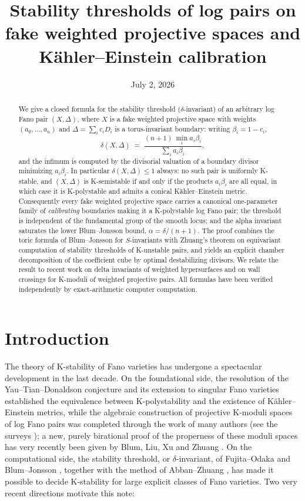 \documentclass[11pt]{amsart}
\title[Stability thresholds of fake weighted projective spaces]{Stability
thresholds of log pairs on fake weighted projective spaces and
K\"ahler--Einstein calibration}
\date{July 2, 2026}
\theoremstyle{definition}
\theoremstyle{remark}
\begin{document}
\begin{abstract}
We give a closed formula for the stability threshold (\(\delta\)-invariant)
of an arbitrary log Fano pair \((X,\Delta)\), where \(X\) is a fake weighted
projective space with weights \((a_0,\dots,a_n)\) and
\(\Delta=\sum_i c_i D_i\) is a torus-invariant boundary: writing
\(\beta_i = 1-c_i\),
\[
\delta(X,\Delta) \;=\; \frac{(n+1)\,\min_i a_i\beta_i}{\sum_i a_i\beta_i},
\]
and the infimum is computed by the divisorial valuation of a boundary
divisor minimizing \(a_i\beta_i\). In particular \(\delta(X,\Delta)\le 1\)
always: no such pair is uniformly K-stable, and \((X,\Delta)\) is
K-semistable if and only if the products \(a_i\beta_i\) are all equal, in
which case it is K-polystable and admits a conical K\"ahler--Einstein
metric. Consequently every fake weighted projective space carries a
canonical one-parameter family of \emph{calibrating} boundaries making it a
K-polystable log Fano pair; the threshold is independent of the fundamental
group of the smooth locus; and the alpha invariant saturates the lower
Blum--Jonsson bound, \(\alpha = \delta/(n+1)\). The proof combines the
toric formula of Blum--Jonsson for \(S\)-invariants with Zhuang's theorem
on equivariant computation of stability thresholds of K-unstable pairs,
and yields an explicit chamber decomposition of the coefficient cube by
optimal destabilizing divisors. We relate the result to recent work on
delta invariants of weighted hypersurfaces and on wall crossings for
K-moduli of weighted projective pairs. All formulas have been verified
independently by exact-arithmetic computer computation.
\end{abstract}

\maketitle

\section{Introduction}\label{sec:intro}

The theory of K-stability of Fano varieties has undergone a spectacular
development in the last decade. On the foundational side, the resolution of
the Yau--Tian--Donaldson conjecture \cite{CDS15,Tia15} and its extension to
singular Fano varieties \cite{LXZ22} established the equivalence between
K-polystability and the existence of K\"ahler--Einstein metrics, while the
algebraic construction of projective K-moduli spaces of log Fano pairs was
completed through the work of many authors (see the surveys
\cite{Xu21,Xu24}); a new, purely birational proof of the properness of these
moduli spaces has very recently been given by Blum, Liu, Xu and Zhuang
\cite{BLXZ25}. On the computational side, the stability threshold, or
\(\delta\)-invariant, of Fujita--Odaka \cite{FO18} and Blum--Jonsson
\cite{BJ20}, together with the method of Abban--Zhuang \cite{AZ22}, has made
it possible to decide K-stability for large explicit classes of Fano
varieties. Two very recent directions motivate this note:
\end{document}
